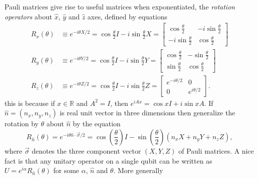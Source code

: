 Pauli matrices give rise to useful matrices when exponentiated, the \textit{rotation operators} about $\hat{x}$, $\hat{y}$ and $\hat{z}$ axes, defined by equations
\begin{align}
    R_x(\theta) & \equiv e^{-i\theta X/2} = \cos{\frac{\theta}{2}}I - i\sin{\frac{\theta}{2}}X = \begin{bmatrix}
        \cos{\frac{\theta}{2}} & -i\sin{\frac{\theta}{2}} \\
        -i\sin{\frac{\theta}{2}} & \cos{\frac{\theta}{2}} 
    \end{bmatrix} \\
    R_y(\theta) & \equiv e^{-i\theta Y/2} = \cos{\frac{\theta}{2}}I - i\sin{\frac{\theta}{2}}Y = \begin{bmatrix}
        \cos{\frac{\theta}{2}} & -\sin{\frac{\theta}{2}} \\
        \sin{\frac{\theta}{2}} & \cos{\frac{\theta}{2}}
    \end{bmatrix} \\
    R_z(\theta) & \equiv e^{-i\theta Z/2} = \cos{\frac{\theta}{2}}I - i\sin{\frac{\theta}{2}}Z = \begin{bmatrix}
        e^{-i\theta/2} & 0 \\
        0 & e^{i\theta/2}
    \end{bmatrix} .
    \end{align}
this is because if $x\in \mathbb{R}$ and $A^2=I$, then $e^{iAx}=\cos{x}I+i\sin{x}A$. If $\hat{n}=(n_x,n_y,n_z)$ is real unit vector in three dimensions then generalize the rotation by $\theta$ about $\hat{n}$ by the equation
\begin{equation}
    R_{\hat{n}}(\theta) = e^{-i\theta \hat{n}\cdot \Vec{\sigma}/2} = \cos{\left( \frac{\theta}{2} \right)}I - \sin{\left( \frac{\theta}{2} \right)}(n_xX+n_yY+n_zZ),
\end{equation}
where $\Vec{\sigma}$ denotes the three component vector $(X, Y, Z)$ of Pauli matrices. A nice fact is that any unitary operator on a single qubit can be written as $U=e^{i\alpha}R_{\hat{n}}(\theta)$ for some $\alpha$, $\hat{n}$ and $\theta$. More generally

